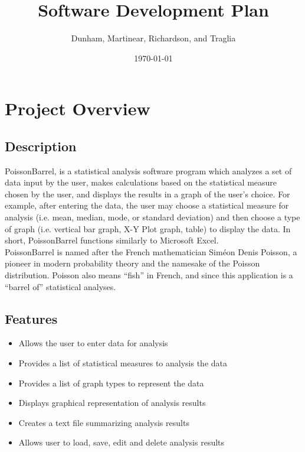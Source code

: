 \documentclass[12pt]{article}
\title{Software Development Plan}
\author{Dunham, Martinear, Richardson, and Traglia}
\date{\today}
\begin{document}
\maketitle
\newpage
\tableofcontents
\newpage


\section{Project Overview}

\subsection{Description}
PoissonBarrel, is a statistical analysis software program which analyzes a set
of data input by the user, makes calculations based on the statistical measure
chosen by the user, and displays the results in a graph of the user's choice.
For example, after entering the data, the user may choose a statistical measure
for analysis (i.e. mean, median, mode, or standard deviation) and then choose a
type of graph (i.e. vertical bar graph, X-Y Plot graph, table) to display the
data. In short, PoissonBarrel functions similarly to Microsoft Excel. \\

PoissonBarrel is named after the French mathematician Siméon Denis Poisson, a
pioneer in modern probability theory and the namesake of the Poisson
distribution. Poisson also means ``fish'' in French, and since this application
is a ``barrel of'' statistical analyses.

\subsection{Features}
\begin{itemize}
\item Allows the user to enter data for analysis
\item Provides a list of statistical measures to analysis the data
\item Provides a list of graph types to represent the data
\item Displays graphical representation of analysis results
\item Creates a text file summarizing analysis results
\item Allows user to load, save, edit and delete analysis results
\end{itemize}
\end{document}
